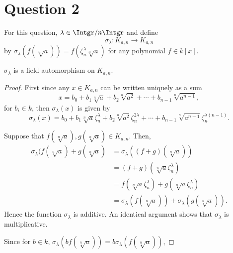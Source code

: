 \documentclass{unswmaths}
\begin{document}
\section*{Question 2}
For this question, $\lambda \in \Intgr/n\Intgr$ and 
define
\begin{equation*}
    \sigma_\lambda: K_{a,n}\rightarrow K_{a,n}
\end{equation*}
by $\sigma_{\lambda}(f(\sqrt[n]{a})) = f(\zeta_n^\lambda \sqrt[n]{a})$
for any polynomial $f \in k[x]$.
\begin{theorem}
    $\sigma_\lambda$ is a field automorphism on $K_{a,n}$.
\end{theorem}
\begin{proof}
    First since any $x \in K_{a,n}$
    can be written uniquely as a sum
    \begin{equation*}
        x = b_0 + b_1\sqrt[n]{a}+b_2\sqrt[n]{a^2} + \cdots + b_{n-1}\sqrt[n]{a^{n-1}},
    \end{equation*}
    for $b_i \in k$, then $\sigma_\lambda(x)$ is given by
    \begin{equation*}
        \sigma_\lambda(x) = b_0 + b_1\sqrt[n]{a}\zeta_n^\lambda+b_2\sqrt[n]{a^2}\zeta_n^{2\lambda}+\cdots+b_{n-1}\sqrt[n]{a^{n-1}}\zeta_n^{\lambda(n-1)}.
    \end{equation*}
    
    Suppose that $f(\sqrt[n]{a}),g(\sqrt[n]{a}) \in K_{a,n}$. Then,
    \begin{align*}
        \sigma_{\lambda}(f(\sqrt[n]{a})+g(\sqrt[n]{a}) &= \sigma_\lambda((f+g)(\sqrt[n]{a}))\\
        &= (f+g)(\sqrt[n]{a}\zeta_n^\lambda)\\
        &= f(\sqrt[n]{a}\zeta_n^\lambda) + g(\sqrt[n]{a}\zeta_n^\lambda)\\
        &= \sigma_\lambda(f(\sqrt[n]{a}))+\sigma_\lambda(g(\sqrt[n]{a})).
    \end{align*}
    Hence the function $\sigma_\lambda$ is additive. An identical argument shows that $\sigma_\lambda$
    is multiplicative.
    
    Since for $b \in k$, $\sigma_\lambda(bf(\sqrt[n]{a})) = b\sigma_\lambda(f(\sqrt[n]{a}))$,
    
\end{proof}
\end{document}

